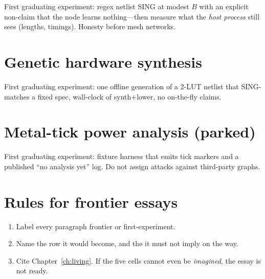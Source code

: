 First graduating experiment: regex netlist SING at modest $B$ with an
explicit non-claim that the node learns nothing---then measure what the
\emph{host process} still sees (lengths, timings). Honesty before mesh
networks.

\section{Genetic hardware synthesis}


First graduating experiment: one offline generation of a 2-LUT netlist that
SING-matches a fixed spec, wall-clock of synth$+$lower, no on-the-fly
claims.

\section{Metal-tick power analysis (parked)}


First graduating experiment: fixture harness that emits tick markers and
a published ``no analysis yet'' log. Do not assign attacks against
third-party graphs.

\section{Rules for frontier essays}

\begin{enumerate}
  \item Label every paragraph frontier or first-experiment.
  \item Name the  row it would become, and the  it must not
        imply on the way.
  \item Cite Chapter~\ref{ch:living}. If the five cells cannot even be
        \emph{imagined}, the essay is not ready.
\end{enumerate}
